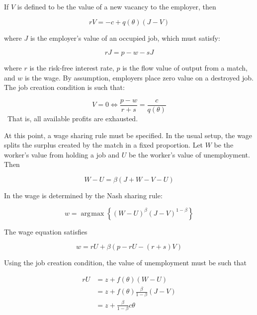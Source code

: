 \documentclass[11pt]{article}
\DeclareMathOperator*{\argmax}{arg\!\max}
\begin{document}
If $V$ is defined to be the value of a new vacancy to the employer, then

\begin{equation}
    rV = -c + q(\theta)(J - V)
\end{equation}

where $J$ is the employer's value of an occupied job, which must satisfy:

\begin{equation}
    rJ = p - w - sJ
\end{equation}

where $r$ is the risk-free interest rate, $p$ is the flow value of output from a match, and $w$ is the wage.
By assumption, employers place zero value on a destroyed job.
The job creation condition is such that:

\begin{equation}
    V = 0 \iff \frac{p - w}{r + s} = \frac{c}{q(\theta)}
\end{equation}
\
That is, all available profits are exhausted.

At this point, a wage sharing rule must be specified.
In the usual setup, the wage splits the surplus created by the match in a fixed proportion.
Let $W$ be the worker's value from holding a job and $U$ be the worker's value of unemployment.
Then

\begin{equation}
    W - U = \beta (J + W - V - U)
\end{equation}

In \cite{pissarides_2009} the wage is determined by the Nash sharing rule:

\begin{equation}
    w = \argmax \left\{ (W - U)^\beta (J - V)^{1 - \beta} \right\}
\end{equation}

The wage equation satisfies

\begin{equation} \label{eq:wage_general}
    w = r U + \beta (p - r U - (r + s) V)
\end{equation}

Using the job creation condition, the value of unemployment must be such that

\begin{align*}
    rU &= z + f(\theta)(W - U)\\
       &= z + f(\theta)\frac{\beta}{1 - \beta}(J - V)\\
       &=z + \frac{\beta}{1 - \beta}c \theta
\end{align*}
\end{document}
